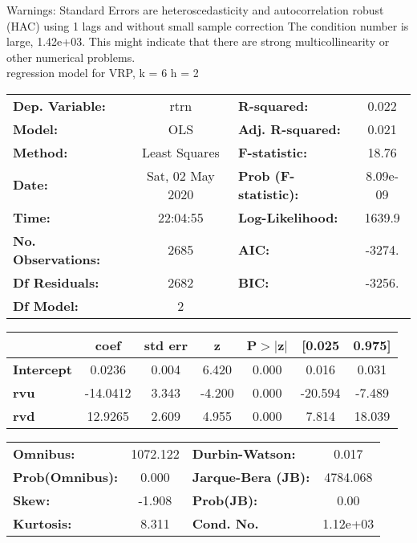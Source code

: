 Warnings: \newline
 [1] Standard Errors are heteroscedasticity and autocorrelation robust (HAC) using 1 lags and without small sample correction \newline
 [2] The condition number is large, 1.42e+03. This might indicate that there are \newline
 strong multicollinearity or other numerical problems.\\ 

regression model for VRP, k = 6 h = 2\begin{center}
\begin{tabular}{lclc}
\toprule
\textbf{Dep. Variable:}    &       rtrn       & \textbf{  R-squared:         } &     0.022   \\
\textbf{Model:}            &       OLS        & \textbf{  Adj. R-squared:    } &     0.021   \\
\textbf{Method:}           &  Least Squares   & \textbf{  F-statistic:       } &     18.76   \\
\textbf{Date:}             & Sat, 02 May 2020 & \textbf{  Prob (F-statistic):} &  8.09e-09   \\
\textbf{Time:}             &     22:04:55     & \textbf{  Log-Likelihood:    } &    1639.9   \\
\textbf{No. Observations:} &        2685      & \textbf{  AIC:               } &    -3274.   \\
\textbf{Df Residuals:}     &        2682      & \textbf{  BIC:               } &    -3256.   \\
\textbf{Df Model:}         &           2      & \textbf{                     } &             \\
\bottomrule
\end{tabular}
\begin{tabular}{lcccccc}
                   & \textbf{coef} & \textbf{std err} & \textbf{z} & \textbf{P$> |$z$|$} & \textbf{[0.025} & \textbf{0.975]}  \\
\midrule
\textbf{Intercept} &       0.0236  &        0.004     &     6.420  &         0.000        &        0.016    &        0.031     \\
\textbf{rvu}       &     -14.0412  &        3.343     &    -4.200  &         0.000        &      -20.594    &       -7.489     \\
\textbf{rvd}       &      12.9265  &        2.609     &     4.955  &         0.000        &        7.814    &       18.039     \\
\bottomrule
\end{tabular}
\begin{tabular}{lclc}
\textbf{Omnibus:}       & 1072.122 & \textbf{  Durbin-Watson:     } &    0.017  \\
\textbf{Prob(Omnibus):} &   0.000  & \textbf{  Jarque-Bera (JB):  } & 4784.068  \\
\textbf{Skew:}          &  -1.908  & \textbf{  Prob(JB):          } &     0.00  \\
\textbf{Kurtosis:}      &   8.311  & \textbf{  Cond. No.          } & 1.12e+03  \\
\bottomrule
\end{tabular}
\end{center}


